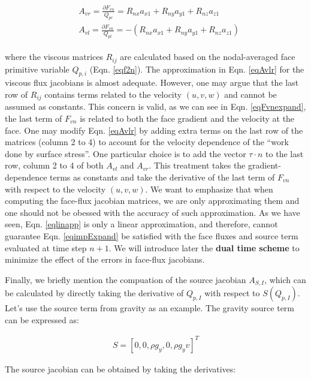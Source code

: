 \documentclass[12pt, letterpaper]{report}
\begin{document}
\begin{align}\label{eqAvlr}
   \begin{split}
      &A_{vr} = \frac{\partial F_{vn}}{Q_{pr}} = R_{nx}a_{x1} + R_{ny}a_{y1} + R_{nz}a_{z1} \\
      &A_{vl} = \frac{\partial F_{vn}}{Q_{pl}} = -(R_{nx}a_{x1} + R_{ny}a_{y1} + R_{nz}a_{z1})
   \end{split}
\end{align}

where the viscous matrices $R_{ij}$ are calculated based on the nodal-averaged face primitive
variable $Q_{p,i}$ (Eqn. \ref{eqf2n}). The approximation in Eqn. \ref{eqAvlr} for the viscous flux
jacobians is almost adequate. However, one may argue that the last row of $R_{ij}$ contains terms
related to the velocity $(u,v,w)$ and cannot be assumed as constants. This concern is valid, as we
can see in Eqn. \ref{eqFvnexpand}, the last term of $F_{vn}$ is related to both the face gradient
and the velocity at the face. One may modify Eqn. \ref{eqAvlr} by adding extra terms on the last row
of the matrices (column 2 to 4) to account for the velocity dependence of the ``work done by surface
stress''. One particular choice is to add the vector $\tau \cdot n$ to the last row, column 2 to 4
of both $A_{vl}$ and $A_{vr}$. This treatment takes the gradient-dependence terms as constants and
take the derivative of the last term of $F_{vn}$ with respect to the velocity $(u,v,w)$. We want to
emphasize that when computing the face-flux jacobian matrices, we are only approximating them and
one should not be obessed with the accuracy of such approximation. As we have seen, Eqn.
\ref{eqlinapp} is only a linear approximation, and therefore, cannot guarantee Eqn.
\ref{eqimpExpand} be satisfied with the face fluxes and source term evaluated at time step $n+1$. We
will introduce later the {\bf dual time scheme} to minimize the effect of the errors in face-flux
jacobians. \paraspace

Finally, we briefly mention the compuation of the source jacobian $A_{S,I}$, which can be calculated
by directly taking the derivative of $Q_{p,I}$ with respect to $S(Q_{p,I})$. Let's use the source
term from gravity as an example. The gravity source term can be expressed as:

\begin{align*}
   S = [0, 0, \rho g_y, 0, \rho g_y v]^T
\end{align*}

The source jacobian can be obtained by taking the derivatives:
\end{document}
